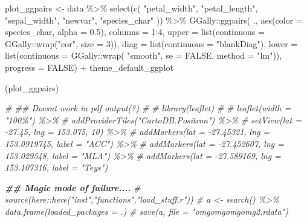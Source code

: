 \documentclass[
]{article}
\newenvironment{Shaded}{\begin{snugshade}}{\end{snugshade}}
\newcommand{\AttributeTok}[1]{\textcolor[rgb]{0.77,0.63,0.00}{#1}}
\newcommand{\CommentTok}[1]{\textcolor[rgb]{0.56,0.35,0.01}{\textit{#1}}}
\newcommand{\ConstantTok}[1]{\textcolor[rgb]{0.00,0.00,0.00}{#1}}
\newcommand{\DecValTok}[1]{\textcolor[rgb]{0.00,0.00,0.81}{#1}}
\newcommand{\DocumentationTok}[1]{\textcolor[rgb]{0.56,0.35,0.01}{\textbf{\textit{#1}}}}
\newcommand{\FloatTok}[1]{\textcolor[rgb]{0.00,0.00,0.81}{#1}}
\newcommand{\FunctionTok}[1]{\textcolor[rgb]{0.00,0.00,0.00}{#1}}
\newcommand{\NormalTok}[1]{#1}
\newcommand{\OtherTok}[1]{\textcolor[rgb]{0.56,0.35,0.01}{#1}}
\newcommand{\SpecialCharTok}[1]{\textcolor[rgb]{0.00,0.00,0.00}{#1}}
\newcommand{\StringTok}[1]{\textcolor[rgb]{0.31,0.60,0.02}{#1}}
\begin{document}
\begin{Shaded}
\begin{Highlighting}[]
\NormalTok{plot\_ggpairs }\OtherTok{\textless{}{-}} 
\NormalTok{  data }\SpecialCharTok{\%\textgreater{}\%}
    \FunctionTok{select}\NormalTok{(}\FunctionTok{c}\NormalTok{(}
      \StringTok{"petal\_width"}\NormalTok{,  }\StringTok{"petal\_length"}\NormalTok{, }\StringTok{"sepal\_width"}\NormalTok{, }\StringTok{"newvar"}\NormalTok{, }\StringTok{"species\_char"}
\NormalTok{    )) }\SpecialCharTok{\%\textgreater{}\%}
\NormalTok{    GGally}\SpecialCharTok{::}\FunctionTok{ggpairs}\NormalTok{( .,  }
             \FunctionTok{aes}\NormalTok{(}\AttributeTok{color =}\NormalTok{ species\_char, }\AttributeTok{alpha =} \FloatTok{0.5}\NormalTok{),}
             \AttributeTok{columns =} \DecValTok{1}\SpecialCharTok{:}\DecValTok{4}\NormalTok{,}
             \AttributeTok{upper =} \FunctionTok{list}\NormalTok{(}\AttributeTok{continuous =}\NormalTok{ GGally}\SpecialCharTok{::}\FunctionTok{wrap}\NormalTok{(}\StringTok{"cor"}\NormalTok{, }\AttributeTok{size =} \DecValTok{3}\NormalTok{)),}
             \AttributeTok{diag =}  \FunctionTok{list}\NormalTok{(}\AttributeTok{continuous =} \StringTok{"blankDiag"}\NormalTok{),}
             \AttributeTok{lower =} \FunctionTok{list}\NormalTok{(}\AttributeTok{continuous =}\NormalTok{ GGally}\SpecialCharTok{::}\FunctionTok{wrap}\NormalTok{( }\StringTok{"smooth"}\NormalTok{, }
                                                     \AttributeTok{se =} \ConstantTok{FALSE}\NormalTok{, }
                                                     \AttributeTok{method =} \StringTok{"lm"}\NormalTok{)),}
             \AttributeTok{progress =} \ConstantTok{FALSE}\NormalTok{) }\SpecialCharTok{+}
\NormalTok{      theme\_default\_ggplot}


\NormalTok{(plot\_ggpairs)}


\CommentTok{\# \#\# Doesn\textquotesingle{}t work in pdf output(?)}
\CommentTok{\# }
\CommentTok{\# library(leaflet)}
\CommentTok{\# }
\CommentTok{\# leaflet(width = "100\%") \%\textgreater{}\%}
\CommentTok{\#   addProviderTiles("CartoDB.Positron") \%\textgreater{}\%}
\CommentTok{\#   setView(lat = {-}27.45, lng = 153.075, 10) \%\textgreater{}\%}
\CommentTok{\#   addMarkers(lat = {-}27.45321, lng = 153.0919745, label = "ACC") \%\textgreater{}\%}
\CommentTok{\#   addMarkers(lat = {-}27.452607, lng = 153.029548, label = "MLA") \%\textgreater{}\%}
\CommentTok{\#   addMarkers(lat = {-}27.589169, lng = 153.107316, label = "Teys")}

\DocumentationTok{\#\# Magic mode of failure.... }
\CommentTok{\# source(here::here("inst","functions","load\_stuff.r"))}
\CommentTok{\# a \textless{}{-} search() \%\textgreater{}\% data.frame(loaded\_packages = .) }
\CommentTok{\# save(a, file = "omgomgomgomg2.rdata")}


\end{Highlighting}
\end{Shaded}
\end{document}
